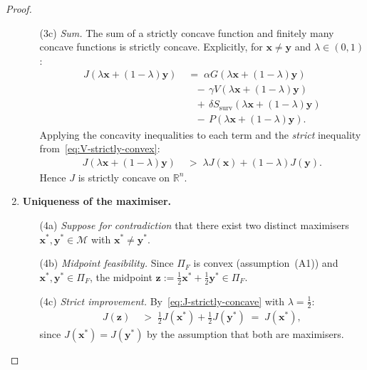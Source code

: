 \documentclass[12pt,openany]{book}
\newcommand{\bfx}{\mathbf{x}}
\newcommand{\bfy}{\mathbf{y}}
\newcommand{\bfz}{\mathbf{z}}
\numberwithin{equation}{chapter}
\theoremstyle{plain}
\theoremstyle{definition}
\theoremstyle{remark}
\numberwithin{equation}{chapter}
\theoremstyle{plain}
\begin{document}
\begin{proof}
\begin{enumerate}
\begin{enumerate}
  \item[\textup{(3c)}] \textit{Sum.}
        The sum of a strictly concave function and finitely many
        concave functions is strictly concave.  Explicitly, for
        $\bfx \neq \bfy$ and $\lambda \in (0,1)$:
        \begin{align}
          J\!\left(\lambda\bfx+(1-\lambda)\bfy\right)
            &\;=\; \alpha G\!\left(\lambda\bfx+(1-\lambda)\bfy\right)
            \nonumber\\
            &\quad -\,\gamma V\!\left(\lambda\bfx+(1-\lambda)\bfy\right)
            \nonumber\\
            &\quad +\,\delta
               S_{\mathrm{surv}}\!\left(\lambda\bfx+(1-\lambda)\bfy\right)
            \nonumber\\
            &\quad -\, P\!\left(\lambda\bfx+(1-\lambda)\bfy\right).
          \label{eq:J-split}
        \end{align}
        Applying the concavity inequalities to each term and the
        \emph{strict} inequality from~\eqref{eq:V-strictly-convex}:
        \begin{align}
          J\!\left(\lambda\bfx+(1-\lambda)\bfy\right)
            &\;>\; \lambda J(\bfx) + (1-\lambda) J(\bfy).
          \label{eq:J-strictly-concave}
        \end{align}
        Hence $J$ is strictly concave on $\mathbb{R}^n$.
\end{enumerate}

\item \textbf{Uniqueness of the maximiser.}

\begin{enumerate}
  \item[\textup{(4a)}] \textit{Suppose for contradiction} that
        there exist two distinct maximisers
        $\bfx^*, \bfy^* \in \mathcal{M}$ with $\bfx^* \neq \bfy^*$.

  \item[\textup{(4b)}] \textit{Midpoint feasibility.}
        Since $\Pi_F$ is convex (assumption~(A1)) and
        $\bfx^*, \bfy^* \in \Pi_F$, the midpoint
        $\bfz := \tfrac{1}{2}\bfx^* + \tfrac{1}{2}\bfy^*
        \in \Pi_F$.

  \item[\textup{(4c)}] \textit{Strict improvement.}
        By~\eqref{eq:J-strictly-concave} with
        $\lambda = \tfrac{1}{2}$:
        \begin{align}
          J(\bfz)
            &\;>\; \tfrac{1}{2} J(\bfx^*) + \tfrac{1}{2} J(\bfy^*)
             \;=\; J(\bfx^*),
          \label{eq:midpoint-improvement}
        \end{align}
        since $J(\bfx^*) = J(\bfy^*)$ by the assumption that
        both are maximisers.


\end{enumerate}
\end{enumerate}
\end{proof}
\end{document}
